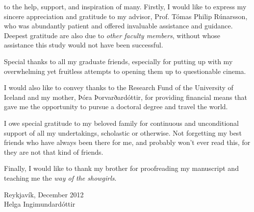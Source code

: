 
 to the help, support, and inspiration of many. Firstly, I would like to express my sincere appreciation and gratitude to my advisor, Prof. Tómas Philip Rúnarsson, who was abundantly patient and offered invaluable assistance and guidance. Deepest gratitude are also due to \emph{other faculty members}, without whose assistance this study would not have been successful.

Special thanks to all my graduate friends, especially for putting up with my overwhelming yet fruitless attempts to opening them up to questionable cinema. 

I would also like to convey thanks to the Research Fund of the University of Iceland and my mother, Þóra Þorvarðardóttir, for providing financial means that gave me the opportunity to pursue a doctoral degree and travel the world. %

I owe special gratitude to my beloved family for continuous and unconditional support of all my undertakings, scholastic or otherwise. Not forgetting my best friends who have always been there for me, and probably won't ever read this, for they are not that kind of friends. 

Finally, I would like to thank my brother for proofreading my manuscript and teaching me the \emph{way of the showgirls}.

\begin{flushright}
	\vfill
	Reykjavík, December 2012 \\ 
	Helga Ingimundardóttir
\end{flushright}

